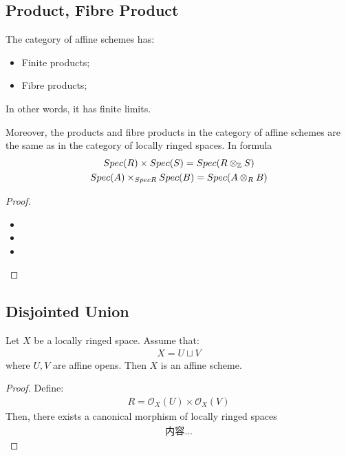 \documentclass[Total.tex]{subfiles}
\begin{document}
			\subsection{Product, Fibre Product}
			\begin{lemma}
				The category of affine schemes has:
				\begin{itemize}
					\item Finite products;
					\item Fibre products;
				\end{itemize}
				In other words, it has finite limits. 
				
				Moreover, the products and fibre products in the category of affine schemes are the same as in the category of locally ringed spaces. In formula
				\begin{gather*}
					Spec(R)\times Spec(S)=Spec(R\otimes_{\mathbb{Z}} S)\\
					Spec(A)\times_{Spec R} Spec(B)=Spec(A\otimes_R B)
				\end{gather*}
			\end{lemma}
			\begin{proof}
				\begin{itemize}
					\item 
					\item 
					\item 
				\end{itemize}
			\end{proof}
			
			\subsection{Disjointed Union}
			
			\begin{lemma}
				Let $X$ be a locally ringed space. Assume that:
				\begin{gather*}
					X=U\sqcup V
				\end{gather*}
				where $U,V$ are affine opens. Then $X$ is an affine scheme.
			\end{lemma}
			
			\begin{proof}
				Define: 
				\begin{gather*}
					R=\mathcal{O}_X(U)\times \mathcal{O}_X(V)
				\end{gather*}
				Then, there exists a canonical morphism of locally ringed spaces
				\begin{gather*}
					内容...
				\end{gather*}
			\end{proof}
		
\end{document}
